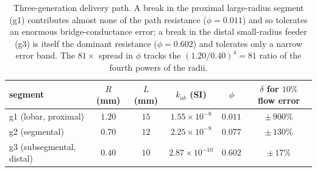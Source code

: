 \documentclass[11pt]{article}
\begin{document}
\begin{table}[h]
\centering
\small
\begin{tabular}{lccccc}
\toprule
segment & $R$ (mm) & $L$ (mm) & $k_{ab}$ (SI) & $\phi$ & $\delta$ for $10\%$ flow error \\
\midrule
g1 (lobar, proximal)      & $1.20$ & $15$ & $1.55\times10^{-8}$ & $0.011$ & $\pm\,900\%$ \\
g2 (segmental)            & $0.70$ & $12$ & $2.25\times10^{-9}$ & $0.077$ & $\pm\,130\%$ \\
g3 (subsegmental, distal) & $0.40$ & $10$ & $2.87\times10^{-10}$ & $0.602$ & $\pm\,17\%$ \\
\bottomrule
\end{tabular}
\caption{Three-generation delivery path. A break in the proximal large-radius
segment (g1) contributes almost none of the path resistance ($\phi=0.011$) and so
tolerates an enormous bridge-conductance error; a break in the distal small-radius
feeder (g3) is itself the dominant resistance ($\phi=0.602$) and tolerates only a
narrow error band. The $81\times$ spread in $\phi$ tracks the
$(1.20/0.40)^4=81$ ratio of the fourth powers of the radii.}
\label{tab:tree}
\end{table}
\end{document}
